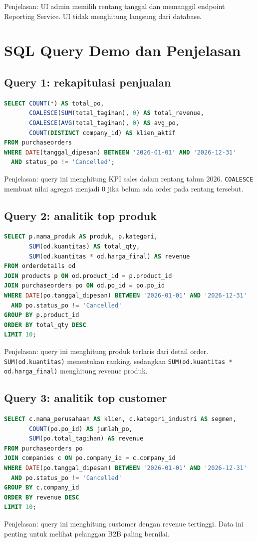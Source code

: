 \documentclass[11pt,a4paper]{article}
\begin{document}
Penjelasan: UI admin memilih rentang tanggal dan memanggil endpoint Reporting Service. UI tidak menghitung langsung dari database.

\section*{SQL Query Demo dan Penjelasan}
\subsection*{Query 1: rekapitulasi penjualan}
\begin{lstlisting}[language=SQL]
SELECT COUNT(*) AS total_po,
       COALESCE(SUM(total_tagihan), 0) AS total_revenue,
       COALESCE(AVG(total_tagihan), 0) AS avg_po,
       COUNT(DISTINCT company_id) AS klien_aktif
FROM purchaseorders
WHERE DATE(tanggal_dipesan) BETWEEN '2026-01-01' AND '2026-12-31'
  AND status_po != 'Cancelled';
\end{lstlisting}
Penjelasan: query ini menghitung KPI sales dalam rentang tahun 2026. \texttt{COALESCE} membuat nilai agregat menjadi 0 jika belum ada order pada rentang tersebut.

\subsection*{Query 2: analitik top produk}
\begin{lstlisting}[language=SQL]
SELECT p.nama_produk AS produk, p.kategori,
       SUM(od.kuantitas) AS total_qty,
       SUM(od.kuantitas * od.harga_final) AS revenue
FROM orderdetails od
JOIN products p ON od.product_id = p.product_id
JOIN purchaseorders po ON od.po_id = po.po_id
WHERE DATE(po.tanggal_dipesan) BETWEEN '2026-01-01' AND '2026-12-31'
  AND po.status_po != 'Cancelled'
GROUP BY p.product_id
ORDER BY total_qty DESC
LIMIT 10;
\end{lstlisting}
Penjelasan: query ini menghitung produk terlaris dari detail order. \texttt{SUM(od.kuantitas)} menentukan ranking, sedangkan \texttt{SUM(od.kuantitas * od.harga\_final)} menghitung revenue produk.

\subsection*{Query 3: analitik top customer}
\begin{lstlisting}[language=SQL]
SELECT c.nama_perusahaan AS klien, c.kategori_industri AS segmen,
       COUNT(po.po_id) AS jumlah_po,
       SUM(po.total_tagihan) AS revenue
FROM purchaseorders po
JOIN companies c ON po.company_id = c.company_id
WHERE DATE(po.tanggal_dipesan) BETWEEN '2026-01-01' AND '2026-12-31'
  AND po.status_po != 'Cancelled'
GROUP BY c.company_id
ORDER BY revenue DESC
LIMIT 10;
\end{lstlisting}
Penjelasan: query ini menghitung customer dengan revenue tertinggi. Data ini penting untuk melihat pelanggan B2B paling bernilai.
\end{document}
